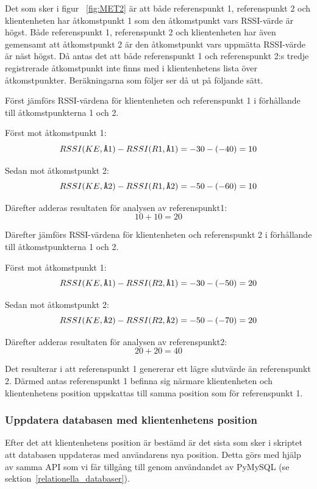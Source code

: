 \documentclass[a4paper,12pt]{article}
\begin{document}
 Det som sker i figur ~\ref{fig:MET2} är att både referenspunkt 1, referenspunkt 2 och klientenheten har åtkomstpunkt 1 som den åtkomstpunkt vars RSSI-värde är högst. Både referenspunkt 1, referenspunkt 2 och klientenheten har även gemensamt att åtkomstpunkt 2 är den åtkomstpunkt vars uppmätta RSSI-värde är näst högst. Då antas det att både referenspunkt 1 och referenspunkt 2:s tredje registrerade åtkomstpunkt inte finns med i klientenhetens lista över åtkomstpunkter. Beräkningarna som följer ser då ut på följande sätt.

 Först jämförs RSSI-värdena för klientenheten och referenspunkt 1 i förhållande till åtkomstpunkterna 1 och 2.

 Först mot åtkomstpunkt 1: $$ RSSI (KE,\verb|Å|1)  -  RSSI (R1,\verb|Å|1) = -30 - (- 40) = 10 $$

 Sedan mot åtkomstpunkt 2: $$ RSSI (KE,\verb|Å|2)  -  RSSI (R1,\verb|Å|2) = -50 - (- 60) = 10 $$

 Därefter adderas resultaten för analysen av referenspunkt1: $$ 10 + 10 = 20$$

 Därefter jämförs RSSI-värdena för klientenheten och referenspunkt 2 i förhållande till åtkomstpunkterna 1 och 2.

 Först mot åtkomstpunkt 1: $$ RSSI (KE,\verb|Å|1)  -  RSSI (R2,\verb|Å|1) = -30 - (- 50) = 20 $$

 Sedan mot åtkomstpunkt 2: $$ RSSI (KE,\verb|Å|2)  -  RSSI (R2,\verb|Å|2) = -50 - (- 70) = 20 $$

 Därefter adderas resultaten för analysen av referenspunkt2: $$ 20 + 20 = 40$$

 Det resulterar i att referenspunkt 1 genererar ett lägre slutvärde än referenspunkt 2. Därmed antas referenspunkt 1 befinna sig närmare klientenheten och klientenhetens position uppskattas till samma position som för referenspunkt 1.

 \subsubsection{Uppdatera databasen med klientenhetens position}
 Efter det att klientenhetens position är bestämd är det sista som sker i skriptet att databasen uppdateras med användarens nya position. Detta görs med hjälp av samma API som vi får tillgång till genom användandet av PyMySQL (se sektion~\ref{relationella_databaser}).
\end{document}
